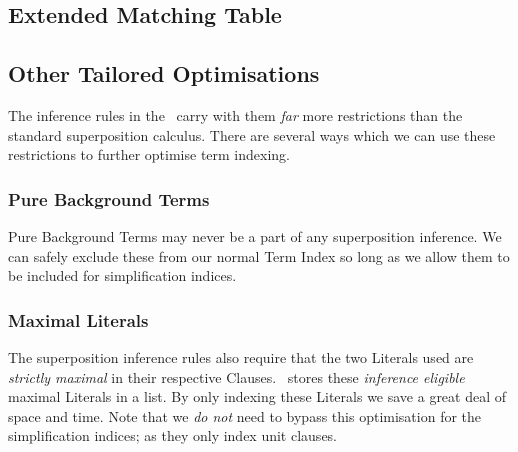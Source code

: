 \subsection{Extended Matching Table}

\subsection{Other Tailored Optimisations}

The inference rules in the \HSWAC\ carry with them \emph{far} more restrictions
than the standard superposition calculus. There are several ways which we can
use these restrictions to further optimise term indexing.

\subsubsection{Pure Background Terms}
Pure Background Terms may never be a part of any superposition inference. We can
safely exclude these from our normal Term Index so long as we allow them to
be included for simplification indices.

\subsubsection{Maximal Literals}
The superposition inference rules also require that the two Literals used are
\emph{strictly maximal} in their respective Clauses. \Beagle\ stores these
\emph{inference eligible} maximal Literals in a list. By only indexing these
Literals we save a great deal of space and time. Note that we \emph{do not} need
to bypass this optimisation for the simplification indices; as they only index
unit clauses.

